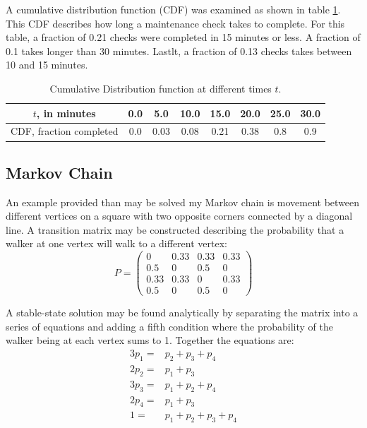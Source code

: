 \message{ !name(Assn1.tex)}\documentclass[twocolumn]{article}
\begin{document}
A cumulative distribution function (CDF) was examined as shown in table \ref{tab:CDF}. This CDF describes how long a maintenance check takes to complete. For this table, a fraction of 0.21 checks were completed in 15 minutes or less. A fraction of 0.1 takes longer than 30 minutes. Lastlt, a fraction of 0.13 checks takes between 10 and 15 minutes.

\begin{table}[h]
\begin{center}
\begin{tabular}{|c|c|c|c|c|c|c|c|}
	\hline $t$, in minutes & 0.0 & 5.0 &10.0  &15.0  &20.0  &25.0  &30.0  \\ 
	\hline  CDF, fraction completed &0.0  &0.03  &0.08  &0.21  &0.38  &0.8  &0.9  \\ 
	\hline 
\end{tabular} 
\end{center}
\caption{Cumulative Distribution function at different times $t$.}
\label{tab:CDF}
\end{table}

\subsection{Markov Chain}
An example provided than may be solved my Markov chain is movement between different vertices on a square with two opposite corners connected by a diagonal line. A transition matrix may be constructed describing the probability that a walker at one vertex will walk to a different vertex:
\[ P = \begin{pmatrix}
0 & 0.33 & 0.33 & 0.33 \\
0.5 & 0 & 0.5 & 0 \\
0.33 & 0.33 & 0 & 0.33 \\
0.5 & 0 & 0.5 & 0
\end{pmatrix} \]

A stable-state solution may be found analytically by separating the matrix into a series of equations and adding a fifth condition where the probability of the walker being at each vertex sums to 1. Together the equations are:
\begin{equation}
\begin{split}
3p_1 =& p_2 + p_3 + p_4 \\
2p_2 =& p_1 + p_3 \\
3p_3 =& p_1 + p_2 + p_4 \\
2p_4 =& p_1 + p_3 \\
1 =& p_1 + p_2 + p_3 + p_4
\end{split}
\end{equation}
\end{document}
